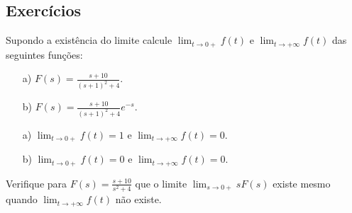 \subsection*{Exercícios}
\begin{exer} Supondo a existência do limite calcule $\lim_{t\to 0+} f(t)$ e $\lim_{t\to +\infty} f(t)$ das seguintes funções:
  \begin{itemize}
    \item[a)] $F(s)=\frac{s+10}{(s+1)^2+4} $.
    \item[b)] $F(s)=\frac{s+10}{(s+1)^2+4}e^{-s}$.
  \end{itemize}
\end{exer}
\begin{resp}
  \begin{itemize}
    \item[a)] $\lim_{t\to 0+} f(t)=1$ e $\lim_{t\to +\infty} f(t)=0$.
    \item[b)] $\lim_{t\to 0+} f(t)=0$ e $\lim_{t\to +\infty} f(t)=0$.
  \end{itemize}
\end{resp}

\begin{exer} Verifique para $F(s)=\frac{s+10}{s^2+4}$ que o limite $\lim_{s\to 0+}sF(s)$ existe mesmo quando $\lim_{t\to +\infty} f(t)$ não existe.
\end{exer}

